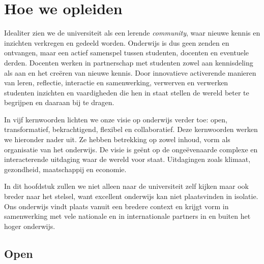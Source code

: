 \documentclass[smallauthor, chapterhaspagenum, nochapterinheader, pagenuminheader,  bigchapnum,medium2, tocpages, garamond, titleinheader]{jote-book}
\begin{document}
	\section{Hoe we opleiden}

	\enlargethispage{-\baselineskip}\checkandfixthelayout

	Idealiter zien we de universiteit als een lerende \emph{community}, waar nieuwe kennis en inzichten verkregen en gedeeld worden. Onderwijs is dus geen zenden en ontvangen, maar een actief samenspel tussen studenten, docenten en eventuele derden. Docenten werken in partnerschap met studenten zowel aan kennisdeling als aan en het creëren van nieuwe kennis. Door innovatieve activerende manieren van leren, reflectie, interactie en samenwerking, verwerven en verwerken studenten inzichten en vaardigheden die hen in staat stellen de wereld beter te begrijpen en daaraan bij te dragen.



	In vijf kernwoorden lichten we onze visie op onderwijs verder toe: open, transformatief, bekrachtigend, flexibel en collaboratief. Deze kernwoorden werken we hieronder nader uit. Ze hebben betrekking op zowel inhoud, vorm als organisatie van het onderwijs. De visie is geënt op de ongeëvenaarde complexe en interacterende uitdaging waar de wereld voor staat. Uitdagingen zoals klimaat, gezondheid, maatschappij en economie.



	In dit hoofdstuk zullen we niet alleen naar de universiteit zelf kijken maar ook breder naar het stelsel, want excellent onderwijs kan niet plaatsvinden in isolatie. Ons onderwijs vindt plaats vanuit een bredere context en krijgt vorm in samenwerking met vele nationale en in internationale partners in en buiten het hoger onderwijs.



	\subsection{Open}
\end{document}
